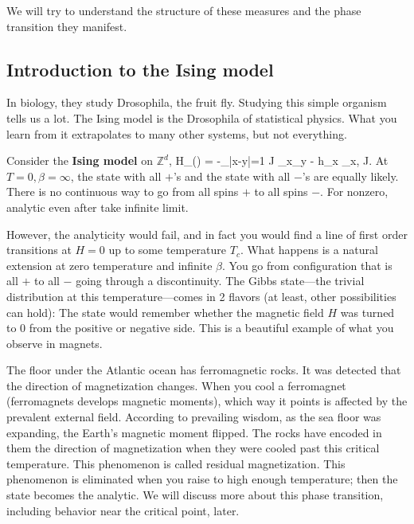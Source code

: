 \documentclass[12pt]{book}
\theoremstyle{norm}
\begin{document}
We will try to understand the structure of these measures and the phase transition they manifest.

\subsection{Introduction to the Ising model}

In biology, they study Drosophila, the fruit fly. Studying this simple organism tells us a lot.
The Ising model is the Drosophila of statistical physics. What you learn from it extrapolates to many other systems, but not everything.


Consider the \textbf{Ising model} on $\mathbb{Z}^d$,
\be
H_\Lambda(\sigma) = -\sum_{|x-y|=1} J \sigma_x\sigma_y - h\sum_{x\in \Lambda} \sigma_x, \qquad J.
\ee
At $T=0,\beta=\infty$, the state with all $+$'s and the state with all $-$'s are equally likely.
There is no continuous way to go from all spins $+$ to all spins $-$.
For nonzero, analytic even after take infinite limit.


However, the analyticity would fail, and in fact you would find a line of first order transitions at $H=0$ up to some temperature $T_c$. 
What happens is a natural extension at zero temperature and infinite $\beta$. You go from configuration that is all $+$ to all $-$ going through a discontinuity. 
The Gibbs state---the trivial distribution at this temperature---comes in 2 flavors (at least, other possibilities can hold): The state would remember whether the magnetic field $H$ was turned to 0 from the positive or negative side. This is a beautiful example of what you observe in magnets. 

The floor under the Atlantic ocean has ferromagnetic rocks. It was detected that the direction of magnetization changes. When you cool a ferromagnet (ferromagnets develops magnetic moments), which way it points is affected by the prevalent external field. According to prevailing wisdom, as the sea floor was expanding, the Earth's magnetic moment flipped. The rocks have encoded in them the direction of magnetization when they were cooled past this critical temperature. This phenomenon is called residual magnetization.
This phenomenon is eliminated when you raise to high enough temperature; then the state becomes the analytic. 
We will discuss more about this phase transition, including behavior near the critical point, later.
\end{document}
